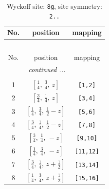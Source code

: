 \documentclass[fleqn,8pt]{jsarticle}
\begin{document}
\renewcommand{\arraystretch}{1.2}
\begin{longtable}{ccc}
\caption{Wyckoff site: {\tt 8g}, site symmetry: {\tt 2..}}
 \\
 \hline \hline
No. & position & mapping \\ \hline \endfirsthead

\multicolumn{2}{l}{\tablename\ \thetable{}} \\
 \hline \hline
No. & position & mapping \\ \hline \endhead

 \hline \hline
\multicolumn{2}{r}{\footnotesize\it continued ...} \\ \endfoot

 \hline \hline
\multicolumn{2}{r}{} \\ \endlastfoot

1 & $\left[ \frac{1}{4},\, \frac{3}{4},\, z \right]$ & {\tt [1,2]} \\ \hline
2 & $\left[ \frac{3}{4},\, \frac{1}{4},\, z \right]$ & {\tt [3,4]} \\ \hline
3 & $\left[ \frac{1}{4},\, \frac{3}{4},\, \frac{1}{2} - z \right]$ & {\tt [5,6]} \\ \hline
4 & $\left[ \frac{3}{4},\, \frac{1}{4},\, \frac{1}{2} - z \right]$ & {\tt [7,8]} \\ \hline
5 & $\left[ \frac{3}{4},\, \frac{1}{4},\, - z \right]$ & {\tt [9,10]} \\ \hline
6 & $\left[ \frac{1}{4},\, \frac{3}{4},\, - z \right]$ & {\tt [11,12]} \\ \hline
7 & $\left[ \frac{3}{4},\, \frac{1}{4},\, z + \frac{1}{2} \right]$ & {\tt [13,14]} \\ \hline
8 & $\left[ \frac{1}{4},\, \frac{3}{4},\, z + \frac{1}{2} \right]$ & {\tt [15,16]} \\
\end{longtable}
\renewcommand{\arraystretch}{1.2}
\end{document}
